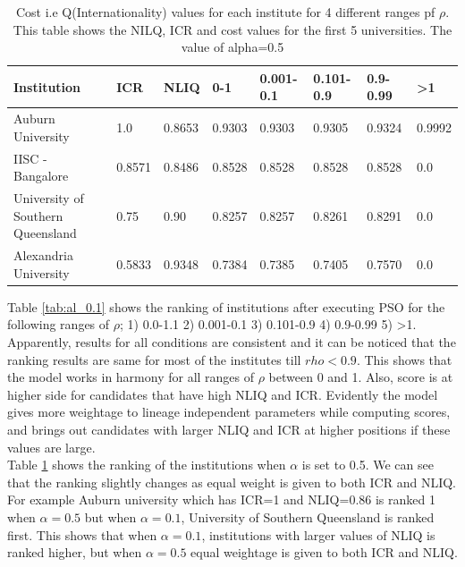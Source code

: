 \documentclass{article}
\begin{document}
\begin{table}[h]
    \centering
    \begin{tabular}{ | m{15em} | m{1cm}| m{1cm} |m{1cm}| m{1cm}|m{1cm}| m{1cm}| m{1cm}|} 
\hline
Institution & ICR & NLIQ & 0-1 & 0.001-0.1 & 0.101-0.9 & 0.9-0.99 & >1\\ 
\hline
Auburn University & 1.0	& 0.8653 & 0.9303 &	0.9303 &	0.9305 &	0.9324 &	0.9992\\
\hline
IISC - Bangalore &
 0.8571 &	0.8486 & 0.8528 &	0.8528 &	0.8528 &	0.8528 &	0.0\\
\hline 
University of Southern Queensland & 0.75 & 0.90 & 0.8257 & 0.8257 &	0.8261 & 0.8291 	& 0.0 \\ 
\hline
Alexandria University & 0.5833&	0.9348 & 0.7384 &	0.7385 & 0.7405 &	0.7570 &	0.0\\
\hline
\end{tabular}

    \caption{Cost i.e Q(Internationality)  values for each institute for 4 different ranges pf $\rho$. This table shows the NILQ, ICR and cost values for the first 5 universities. The value of alpha=0.5}
    \label{tab:al_0.5}
\end{table}

Table \ref{tab:al_0.1}
shows the ranking of institutions after executing PSO for the following ranges of $\rho$; 1) 0.0-1.1 2) 0.001-0.1 
3) 0.101-0.9 
4) 0.9-0.99 
5) >1. %
Apparently, results for all conditions are consistent and it can be noticed that the ranking results are same for most of the institutes till  $rho<0.9$. This shows that the model works in harmony for all ranges of $\rho$ between 0 and 1. Also, score is at higher side for candidates that have high NLIQ and ICR. Evidently the model gives more weightage to lineage independent parameters while computing scores, and brings out candidates with larger NLIQ and ICR at higher positions if these values are large. \\
Table \ref{tab:al_0.5} shows the ranking of the institutions when $\alpha$ is set to 0.5. We can see that the ranking slightly changes as equal weight is given to both ICR and NLIQ. For example Auburn university which has ICR=1 and NLIQ=0.86 is ranked 1 when $\alpha=0.5$ but when $\alpha=0.1$, University of Southern Queensland is ranked first. This shows that when $\alpha=0.1$, institutions with larger values of NLIQ is ranked higher, but when $\alpha=0.5$ equal weightage is given to both ICR and NLIQ.
\end{document}
